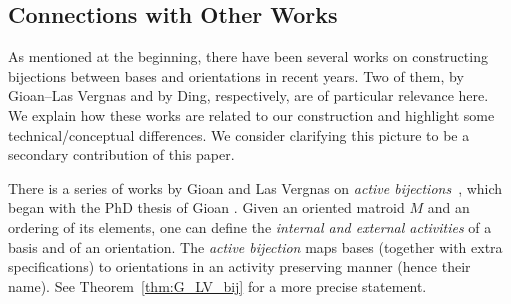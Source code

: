 \documentclass[12pt]{amsart}
\numberwithin{equation}{section}
\theoremstyle{definition}
\newcommand{\Paco}[1]{\todo[size=\tiny,inline,color=orange!30]{#1 \\ \hfill --- P.}}
\begin{document}



\subsection{Connections with Other Works} \label{sec:connection}

As mentioned at the beginning, there have been several works on constructing bijections between bases and orientations in recent years. Two of them, by Gioan--Las Vergnas and by Ding, respectively, are of particular relevance here. We explain how these works are related to our construction and highlight some technical/conceptual differences. We consider clarifying this picture to be a secondary contribution of this paper.

\medskip

There is a series of works by Gioan and Las Vergnas on {\em active bijections}~\cite{gioan2015survey, gioan2022tutte, gioanactive, gioan2004active, GLV_Uniform, gioan2005activity, gioan2007fully, GLV_AB1, gioan2009linear, GLV_AB2a, GLV_AB2b, gioan2019active, gioan2018computing, las1984correspondence}, which began with the PhD thesis  of Gioan \cite{Gioan_thesis}. Given an oriented matroid $M$ and an ordering of its elements, one can define the {\em internal and external activities} of a basis and of an orientation. The \emph{active bijection} maps bases (together with extra specifications) to orientations in an activity preserving manner (hence their name). See Theorem~\ref{thm:G_LV_bij} for a more precise statement.
\end{document}
